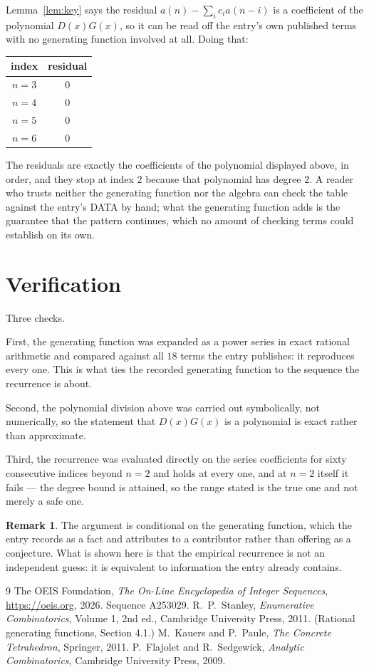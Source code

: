\documentclass[11pt,a4paper]{article}
\theoremstyle{plain}
\theoremstyle{definition}
\newtheorem{remark}[theorem]{Remark}
\begin{document}
Lemma~\ref{lem:key} says the residual $a(n)-\sum_ic_ia(n-i)$ is a coefficient of the
polynomial $D(x)G(x)$, so it can be read off the entry's own published terms with no
generating function involved at all. Doing that:
\begin{center}
\begin{tabular}{cc}
index & residual \\ \hline
$n=3$ & $0$ \\
$n=4$ & $0$ \\
$n=5$ & $0$ \\
$n=6$ & $0$
\end{tabular}
\end{center}
The residuals are exactly the coefficients of the polynomial displayed above, in order, and
they stop at index $2$ because that polynomial has degree $2$. A reader who trusts
neither the generating function nor the algebra can check the table against the entry's DATA
by hand; what the generating function adds is the guarantee that the pattern continues, which
no amount of checking terms could establish on its own.

\section{Verification}

Three checks.

First, the generating function was expanded as a power series in exact rational arithmetic and
compared against all $18$ terms the entry publishes: it reproduces every one. This is
what ties the recorded generating function to the sequence the recurrence is about.

Second, the polynomial division above was carried out symbolically, not numerically, so the
statement that $D(x)G(x)$ is a polynomial is exact rather than approximate.

Third, the recurrence was evaluated directly on the series coefficients for sixty consecutive
indices beyond $n=2$ and holds at every one, and at $n=2$ itself it fails --- the
degree bound is attained, so the range stated is the true one and not merely a safe one.

\begin{remark}
The argument is conditional on the generating function, which the entry records as a fact and
attributes to a contributor rather than offering as a conjecture. What is shown here is that
the empirical recurrence is not an independent guess: it is equivalent to information the
entry already contains.
\end{remark}

\begin{thebibliography}{9}
 The OEIS Foundation, \emph{The On-Line Encyclopedia of Integer
Sequences}, \url{https://oeis.org}, 2026. Sequence A253029.
 R.~P.~Stanley, \emph{Enumerative Combinatorics}, Volume 1, 2nd ed.,
Cambridge University Press, 2011. (Rational generating functions, Section 4.1.)
 M.~Kauers and P.~Paule, \emph{The Concrete Tetrahedron}, Springer, 2011.
 P.~Flajolet and R.~Sedgewick, \emph{Analytic Combinatorics}, Cambridge
University Press, 2009.
\end{thebibliography}
\end{document}
